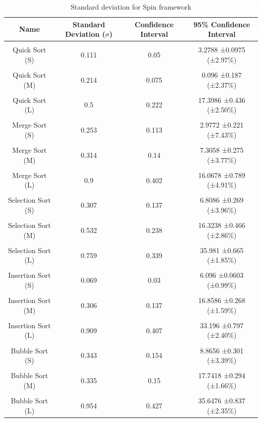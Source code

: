 \bigskip
\begin{table}[h!]
\centering
\begin{tabular}{||c c c c||} 
\hline
Name & Standard Deviation ($\sigma$) & Confidence Interval & 95\% Confidence Interval \\ [1ex] 
\hline\hline
 & & & \\
Quick Sort (S) & 0.111 & 0.05 & 3.2788 ±0.0975 (±2.97\%) \\
 & & & \\
Quick Sort (M) & 0.214 & 0.075 & 0.096 ±0.187 (±2.37\%) \\
 & & & \\
Quick Sort (L) & 0.5 & 0.222 & 17.3986 ±0.436 (±2.50\%) \\
 & & & \\
Merge Sort (S) & 0.253 & 0.113 & 2.9772 ±0.221 (±7.43\%) \\
 & & & \\
Merge Sort (M) & 0.314 & 0.14 & 7.3058 ±0.275 (±3.77\%) \\
 & & & \\
Merge Sort (L) & 0.9 & 0.402 & 16.0678 ±0.789 (±4.91\%) \\
 & & & \\
Selection Sort (S) & 0.307 & 0.137 & 6.8086 ±0.269 (±3.96\%) \\
 & & & \\
Selection Sort (M) & 0.532 & 0.238 & 16.3238 ±0.466 (±2.86\%) \\
 & & & \\
Selection Sort (L) & 0.759 & 0.339 & 35.981 ±0.665 (±1.85\%) \\
 & & & \\
Insertion Sort (S) & 0.069 & 0.03 & 6.096 ±0.0603 (±0.99\%) \\
 & & & \\
Insertion Sort (M) & 0.306 & 0.137 & 16.8586 ±0.268 (±1.59\%) \\
 & & & \\
Insertion Sort (L) & 0.909 & 0.407 & 33.196 ±0.797 (±2.40\%) \\
 & & & \\
Bubble Sort (S) & 0.343 & 0.154 & 8.8656 ±0.301 (±3.39\%) \\
 & & & \\
Bubble Sort (M) & 0.335 & 0.15 & 17.7418 ±0.294 (±1.66\%) \\
 & & & \\
Bubble Sort (L) & 0.954 & 0.427 & 35.6476 ±0.837 (±2.35\%) \\ [1ex]
\hline
\end{tabular}
\caption{Standard deviation for Spin framework}
\label{table:time_complexity_2}
\end{table}
\bigskip

